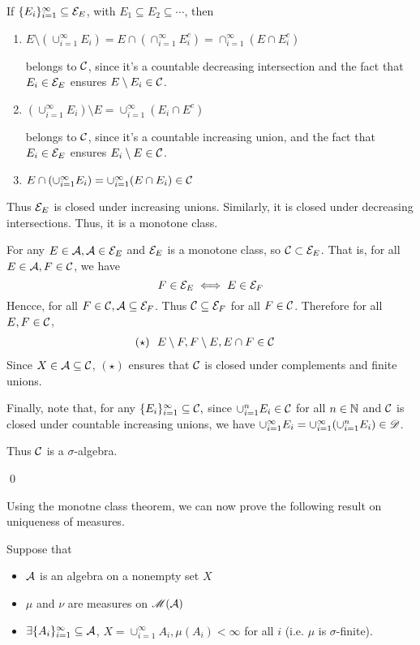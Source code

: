 \documentclass[x11names,reqno,14pt]{extarticle}
\newcommand*{\oo}{\infty}
\newcommand{\seq}[1]{_{#1 = 1}^\oo}
\begin{document}
If $\{E_i\}\seq{i}\subseteq\mc{E}_E$, with $E_1\subseteq E_2\subseteq\cdots$, then
\begin{enumerate}[label=(\roman*)]
\item $E\setminus(\cup\seq{i}E_i) = E\cap (\cap\seq{i}E_i^c) = \cap\seq{i}(E\cap E_i^c) $

belongs to $\mathcal{C}$, since it's a countable decreasing intersection and the fact that $E_i\in\mathcal{E}_E$ ensures $E\setminus E_i\in\mathcal{C}$. 
\item $(\cup\seq{i}E_i)\setminus E = \cup\seq{i}(E_i \cap E^c)$

belongs to $\mathcal{C}$, since it's a countable increasing union, and the fact that $E_i \in \mathcal{E}_E$ ensures $E_i\setminus E\in\mathcal{C}$. 
\item $E \cap (\cup\seq{i}E_i) = \cup\seq{i}(E\cap E_i) \in \mc{C}$

\end{enumerate}

Thus $\mathcal{E}_E$ is closed under increasing unions. Similarly, it is closed under decreasing intersections. Thus, it is a monotone class. 

For any $E \in \mathcal{A}, \mathcal{A}\in\mathcal{E}_E$ and $\mathcal{E}_E$ is a monotone class, so $\mathcal{C}\subset\mathcal{E}_E$. That is, for all $E \in \mathcal{A}, F\in\mathcal{C}$, we have
\[
F\in\mathcal{E}_E\iff E\in\mathcal{E}_F
\]
Hencce, for all $F\in\mathcal{C}, \mathcal{A}\subseteq\mathcal{E}_F$. Thus $\mathcal{C}\subseteq\mathcal{E}_F$ for all $F\in\mathcal{C}$. Therefore for all $E, F \in \mathcal{C}$, 
\begin{align*}
(\star) \,\,& \,\, E\setminus F, F\setminus E, E \cap F \in \mathcal{C}
\end{align*}
Since $X \in \mathcal{A}\subseteq\mathcal{C}$, $(\star)$ ensures that $\mathcal{C}$ is closed under complements and finite unions. 

Finally, note that, for any $\{E_i\}\seq{i}\subseteq\mc{C},$ since $\cup_{i=1}^nE_i\in\mathcal{C}$ for all $n \in \mathbb{N}$ and $\mathcal{C}$ is closed under countable increasing unions, we have $\cup\seq{i}E_i = \cup\seq{i}(\cup_{i=1}^nE_i)\in\ms{D}$. 

Thus $\mathcal{C}$ is a $\sigma$-algebra. 

\qed

Using the monotne class theorem, we can now prove the following result on uniqueness of measures. 

\thm

Suppose that
\begin{itemize}
\item $\mathcal{A}$ is an algebra on a nonempty set $X$
\item $\mu$ and $\nu$ are measures on $\mathscr{M}(\mathcal{A})$
\item $\exists\{A_i\}\seq{i}\subseteq\mc{A}$, $X = \cup\seq{i}A_i, \mu(A_i)<\oo$ for all $i$ (i.e. $\mu$ is $\sigma$-finite).
\end{itemize}
\end{document}
